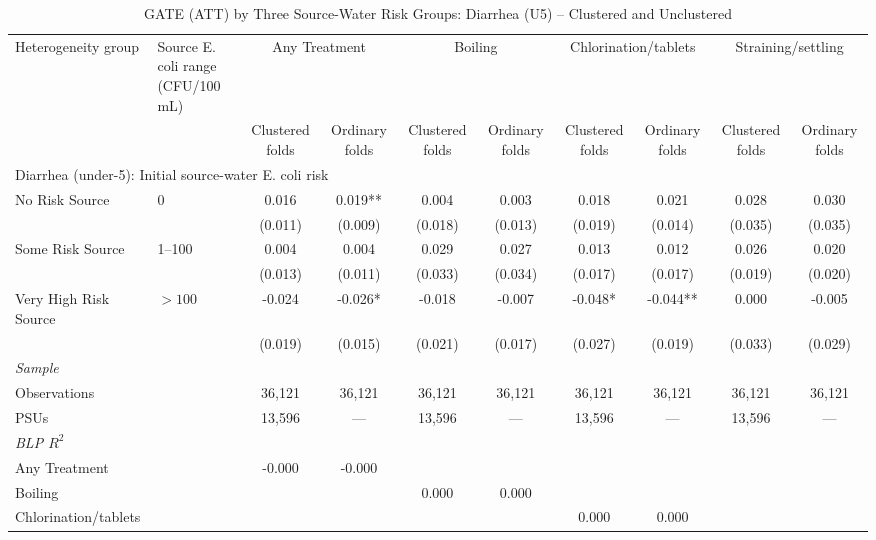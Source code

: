\begin{landscape}
\begin{table}[p]
\centering
\caption{GATE (ATT) by Three Source-Water Risk Groups: Diarrhea (U5) -- Clustered and Unclustered}
\label{tab:table_gate_appendix_risk_groups-diarrhea}
\scriptsize\setlength{\tabcolsep}{4pt}
\begin{adjustbox}{max width=\linewidth, center}
\begin{tabular}{llcccccccc}
\toprule
Heterogeneity group & \shortstack{Source E. coli range\\(CFU/100 mL)} & \multicolumn{2}{c}{Any Treatment} & \multicolumn{2}{c}{Boiling} & \multicolumn{2}{c}{Chlorination/tablets} & \multicolumn{2}{c}{Straining/settling} \\
 &  & Clustered folds & Ordinary folds & Clustered folds & Ordinary folds & Clustered folds & Ordinary folds & Clustered folds & Ordinary folds \\
\midrule
\multicolumn{10}{l}{Diarrhea (under-5): Initial source-water E. coli risk} \\
No Risk Source & 0 & 0.016 & 0.019** & 0.004 & 0.003 & 0.018 & 0.021 & 0.028 & 0.030 \\
 &  & (0.011) & (0.009) & (0.018) & (0.013) & (0.019) & (0.014) & (0.035) & (0.035) \\
Some Risk Source & 1--100 & 0.004 & 0.004 & 0.029 & 0.027 & 0.013 & 0.012 & 0.026 & 0.020 \\
 &  & (0.013) & (0.011) & (0.033) & (0.034) & (0.017) & (0.017) & (0.019) & (0.020) \\
Very High Risk Source & $>100$ & -0.024 & -0.026* & -0.018 & -0.007 & -0.048* & -0.044** & 0.000 & -0.005 \\
 &  & (0.019) & (0.015) & (0.021) & (0.017) & (0.027) & (0.019) & (0.033) & (0.029) \\
\multicolumn{10}{l}{\textit{Sample}} \\
\quad Observations &  & 36,121 & 36,121 & 36,121 & 36,121 & 36,121 & 36,121 & 36,121 & 36,121 \\
\quad PSUs &  & 13,596 & --- & 13,596 & --- & 13,596 & --- & 13,596 & --- \\
\multicolumn{10}{l}{\textit{BLP $R^{2}$}} \\
\quad Any Treatment &  & -0.000 & -0.000 &  &  &  &  &  &  \\
\quad Boiling &  &  &  & 0.000 & 0.000 &  &  &  &  \\
\quad Chlorination/tablets &  &  &  &  &  & 0.000 & 0.000 &  &  \\

\end{tabular}
\end{adjustbox}
\end{table}
\end{landscape}
